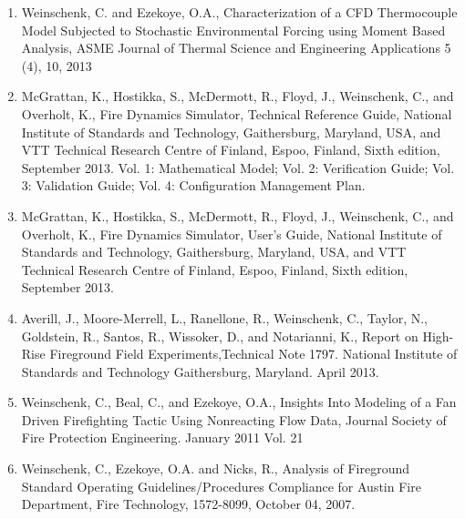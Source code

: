 \documentclass[10pt,letterpaper]{article}
\begin{document}
\begin{enumerate}
\item  Weinschenk, C. and Ezekoye, O.A., Characterization of a CFD Thermocouple Model Subjected to Stochastic Environmental Forcing using Moment Based Analysis, ASME Journal of Thermal Science and Engineering Applications 5 (4), 10, 2013
\item McGrattan, K., Hostikka, S., McDermott, R., Floyd, J., Weinschenk, C., and Overholt, K., Fire Dynamics Simulator, Technical Reference Guide, National Institute of Standards and Technology, Gaithersburg, Maryland, USA, and VTT Technical Research Centre of Finland, Espoo, Finland, Sixth edition, September 2013. Vol. 1: Mathematical Model; Vol. 2: Verification Guide; Vol. 3: Validation Guide; Vol. 4: Configuration Management Plan.
\item McGrattan, K., Hostikka, S., McDermott, R., Floyd, J., Weinschenk, C., and Overholt, K., Fire Dynamics Simulator, User's Guide, National Institute of Standards and Technology, Gaithersburg, Maryland, USA, and VTT Technical Research Centre of Finland, Espoo, Finland, Sixth edition, September 2013.
\item Averill, J., Moore-Merrell, L., Ranellone, R., Weinschenk, C., Taylor, N., Goldstein, R., Santos, R., Wissoker, D., and Notarianni, K., Report on High-Rise Fireground Field Experiments,Technical Note 1797. National Institute of Standards and Technology Gaithersburg, Maryland. April 2013.
\item Weinschenk, C., Beal, C., and Ezekoye, O.A., Insights Into Modeling of a Fan Driven Firefighting Tactic Using Nonreacting Flow Data, Journal Society of Fire Protection Engineering. January 2011 Vol. 21
\item Weinschenk, C., Ezekoye, O.A. and Nicks, R., Analysis of Fireground Standard Operating Guidelines/Procedures Compliance for Austin Fire Department, Fire Technology, 1572-8099, October 04, 2007.
\end{enumerate}

\end{document}
